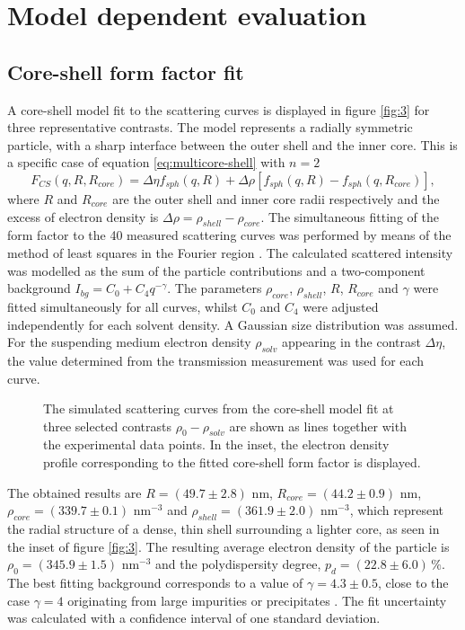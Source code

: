 \section{Model dependent evaluation}
\subsection{Core-shell form factor fit}
\label{sec:coreshell_fit}
A core-shell model fit to the scattering curves is displayed in figure \ref{fig:3} for three representative contrasts. The model represents a radially symmetric particle, with a sharp interface between the outer shell and the inner core. This is a specific case of equation \eqref{eq:multicore-shell} with \( n=2 \)
\begin{equation}
F_{CS}(q,R,R_{core})=\Delta\eta f_{sph}(q,R)+\Delta\rho\left[ f_{sph}(q,R)-f_{sph}(q,R_{core}) \right] ,
\label{eq:ff_cs}
\end{equation}
where \(R \) and \(R_{core} \)  are the outer shell and inner core radii respectively and the excess of electron density is \(\Delta\rho=\rho_{shell}-\rho_{core}\). The simultaneous fitting of the form factor to the 40 measured scattering curves was performed by means of the method of least squares in the Fourier region \citet{Pedersen1997}. The calculated scattered intensity was modelled as the sum of the particle contributions and a two-component background \(I_{bg}=C_0+C_4q^{-\gamma} \). The parameters \(\rho_{core}\), \(\rho_{shell}\), \(R\), \(R_{core}\) and \(\gamma\) were fitted simultaneously for all curves, whilst \( C_0 \) and \( C_4 \) were adjusted independently for each solvent density. A Gaussian size distribution was assumed. For the suspending medium electron density \( \rho_{solv} \) appearing in the contrast \( \Delta\eta \), the value determined from the transmission measurement was used for each curve.

\begin{figure}%
	\centering
		
		\caption{ The simulated scattering curves from the core-shell model fit at three selected contrasts $\rho_0-\rho_{solv}$ are shown as lines together with the experimental data points. In the inset, the electron density profile corresponding to the fitted core-shell form factor is displayed.}
		\label{fig:KiskerSAXSCoreshellFit}
\end{figure}

The obtained results are \(R=\left(49.7 \pm 2.8\right) \) nm, \(R_{core}=\left(44.2 \pm 0.9\right) \) nm, \(\rho_{core}=\left(339.7 \pm 0.1\right)\) nm\(^{-3}\) and \(\rho_{shell}=\left(361.9 \pm 2.0\right)\) nm\(^{-3}\), which represent the radial structure of a dense, thin shell surrounding a lighter core, as seen in the inset of figure \ref{fig:3}. The resulting average electron density of the particle is \(\rho_{0}=\left(345.9 \pm 1.5\right)\) nm\(^{-3}\) and the polydispersity degree, \(p_d=\left(22.8\pm 6.0\right)\,\%\). The best fitting background corresponds to a value of \( \gamma = 4.3\pm 0.5 \), close to the case \( \gamma = 4 \) originating from large impurities or precipitates \citet{pedersen_determination_1994}. The fit uncertainty was calculated with a confidence interval of one standard deviation. 

